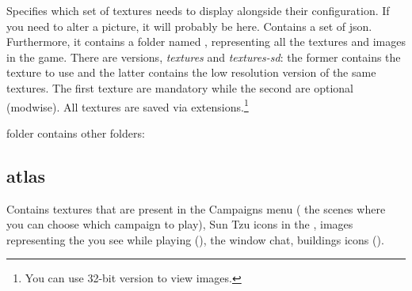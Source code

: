 \begin{appendices}
    Specifies which set of textures \aoe{} needs to display alongside their configuration. If you need to alter a picture, it will probably be here.
    Contains a set of json.
    Furthermore, it contains a folder named , representing all the textures and images in the game. There are versions, \textit{textures} and \textit{textures-sd}: the former contains the texture to use and the latter contains the low resolution version of the same textures. The first texture are mandatory while the second are optional (modwise). All textures are saved via  extensions.\footnote{You can use  32-bit version to view  images.}

     folder contains other folders:

    \subsection{atlas} 

    Contains textures that are present in the Campaigns menu (\eg{} the scenes where you can choose which campaign to play), Sun Tzu icons in the , images representing the  you see while playing (), the window chat, buildings icons ().


\end{appendices}
